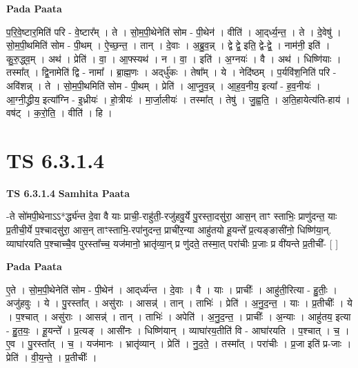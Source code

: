 \documentclass[17pt]{extarticle}
\begin{document}
\textbf{Pada Paata} \newline

प॒रि॒वे॒ष्टार॒मिति॑ परि - वे॒ष्टार᳚म् । ते । सो॒म॒पी॒थेनेति॑ सोम - पी॒थेन॑ । वीति॑ । आ॒द्‌र्ध्य॒न्त॒ । ते । दे॒वेषु॑ । सो॒म॒पी॒थमिति॑ सोम - पी॒थम् । ऐ॒च्छ॒न्त॒ । तान् । दे॒वाः । अ॒ब्रु॒व॒न्न् । द्वे द्वे॒ इति॒ द्वे-द्वे॒ । नाम॑नी॒ इति॑ । कु॒रु॒द्ध्व॒म् । अथ॑ । प्रेति॑ । वा॒ । आ॒फ्स्यथ॑ । न । वा॒ । इति॑ । अ॒ग्नयः॑ । वै । अथ॑ । धिष्णि॑याः । तस्मा᳚त् । द्वि॒नामेति॑ द्वि - नामा᳚ । ब्रा॒ह्म॒णः । अद्‌र्धु॑कः । तेषा᳚म् । ये । नेदि॑ष्ठम् । प॒र्यवि॑श॒निति॑ परि - अवि॑शन्न् । ते । सो॒म॒पी॒थमिति॑ सोम - पी॒थम् । प्रेति॑ । आ॒प्नु॒व॒न्न् । आ॒ह॒व॒नीय॒ इत्या᳚ - ह॒व॒नीयः॑ । आ॒ग्नी॒द्ध्रीय॒ इत्या᳚ग्नि - इ॒ध्रीयः॑ । हो॒त्रीयः॑ । मा॒र्जा॒लीयः॑ । तस्मा᳚त् । तेषु॑ । जु॒ह्व॒ति॒ । अ॒ति॒हायेत्य॑ति-हाय॑ । वष॑ट् । क॒रो॒ति॒ । वीति॑ । हि ।  \newline




\section*{ TS 6.3.1.4 }

\textbf{TS 6.3.1.4 } \newline
\textbf{Samhita Paata} \newline

-ते सो॑मपी॒थेनाऽऽ*र्द्ध्य॑न्त दे॒वा वै याः प्राची॒-राहु॑ती॒-रजु॑हवु॒र्ये पु॒रस्ता॒दसु॑रा॒ आस॒न् ताꣳ स्ताभिः॒ प्राणु॑दन्त॒ याः प्र॒तीची॒र्ये प॒श्चादसु॑रा॒ आस॒न् ताꣳस्ताभि॒-रपा॑नुदन्त॒ प्राची॑र॒न्या आहु॑तयो हू॒यन्ते᳚ प्र॒त्यङ्ङासी॑नो॒ धिष्णि॑या॒न्. व्याघा॑रयति प॒श्चाच्चै॒व पुरस्ता᳚च्च॒ यज॑मानो॒ भ्रातृ॑व्या॒न् प्र णु॑दते॒ तस्मा॒त् परा॑चीः प्र॒जाः प्र वी॑यन्ते प्र॒तीची᳚- [  ] \newline

\textbf{Pada Paata} \newline

ए॒ते । सो॒म॒पी॒थेनेति॑ सोम - पी॒थेन॑ । आद्‌र्ध्य॑न्त । दे॒वाः । वै । याः । प्राचीः᳚ । आहु॑ती॒रित्या - हु॒तीः॒ । अजु॑हवुः । ये । पु॒रस्ता᳚त् । असु॑राः । आसन्न्॑ । तान् । ताभिः॑ । प्रेति॑ । अ॒नु॒द॒न्त॒ । याः । प्र॒तीचीः᳚ । ये । प॒श्चात् । असु॑राः । आसन्न्॑ । तान् । ताभिः॑ । अपेति॑ । अ॒नु॒द॒न्त॒ । प्राचीः᳚ । अ॒न्याः । आहु॑तय॒ इत्या - हु॒त॒यः॒ । हू॒यन्ते᳚ । प्र॒त्यङ् । आसी॑नः । धिष्णि॑यान् । व्याघा॑रय॒तीति॑ वि - आघा॑रयति । प॒श्चात् । च॒ । ए॒व । पु॒रस्ता᳚त् । च॒ । यज॑मानः । भ्रातृ॑व्यान् । प्रेति॑ । नु॒द॒ते॒ । तस्मा᳚त् । परा॑चीः । प्र॒जा इति॑ प्र-जाः । प्रेति॑ । वी॒य॒न्ते॒ । प्र॒तीचीः᳚ ।  \newline
\end{document}
